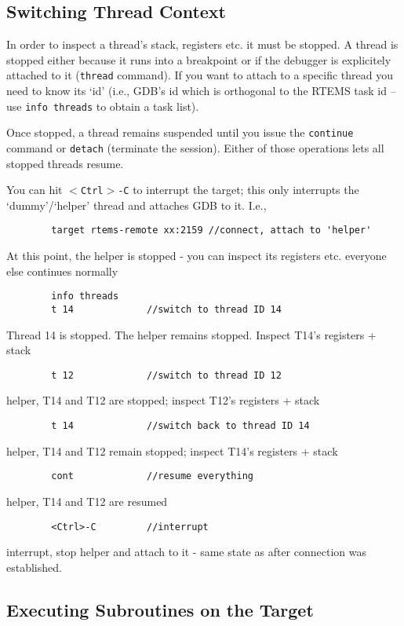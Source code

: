 \documentclass{article}
\newcommand{\cmd}[1]{{\tt #1}}
\begin{document}
\subsection{Switching Thread Context}
	In order to inspect a thread's stack, registers etc.
	it must be stopped.
	A thread is stopped either because it runs into a
	breakpoint or if the debugger is explicitely
	attached to it (\cmd{thread} command). If you want to attach
	to a specific thread you need to know its `id'
	(i.e., GDB's id which is orthogonal to the RTEMS task id
	-- use \cmd{info threads} to obtain a task list).

	Once stopped, a thread remains suspended until you
	issue the \cmd{continue} command or \cmd{detach} (terminate
	the session). Either of those operations lets all stopped
	threads resume.

	You can hit \cmd{$<$Ctrl$>$-C} to interrupt the target; this
	only interrupts the `dummy'/`helper' thread and
	attaches GDB to it.  I.e., 
\begin{verbatim}
		target rtems-remote xx:2159 //connect, attach to 'helper'
\end{verbatim}
	At this point, the helper is stopped - you can inspect its
	registers etc. everyone else continues normally
\begin{verbatim}
		info threads
		t 14             //switch to thread ID 14
\end{verbatim}
	Thread 14 is stopped. The helper remains stopped. Inspect
	T14's registers + stack
\begin{verbatim}
		t 12             //switch to thread ID 12
\end{verbatim}
	helper, T14 and T12 are stopped; inspect T12's registers + stack
\begin{verbatim}
		t 14             //switch back to thread ID 14
\end{verbatim}
	helper, T14 and T12 remain stopped; inspect T14's registers + stack
\begin{verbatim}
		cont             //resume everything
\end{verbatim}
	helper, T14 and T12 are resumed
\begin{verbatim}
		<Ctrl>-C         //interrupt
\end{verbatim}
	interrupt, stop helper and attach to it - same state as
	after connection was established.

\subsection{Executing Subroutines on the Target}
\end{document}
